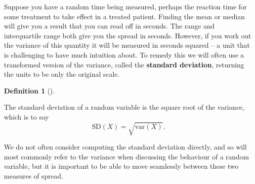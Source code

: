 \documentclass[
  letterpaper,
  DIV=11,
  numbers=noendperiod]{scrreprt}
\theoremstyle{definition}
\theoremstyle{definition}
\theoremstyle{definition}
\newtheorem{definition}{Definition}[chapter]
\theoremstyle{remark}
\begin{document}
Suppose you have a random time being measured, perhaps the reaction time
for some treatment to take effect in a treated patient. Finding the mean
or median will give you a result that you can read off in seconds. The
range and interquartile range both give you the spread in seconds.
However, if you work out the variance of this quantity it will be
measured in seconds squared -- a unit that is challenging to have much
intuition about. To remedy this we will often use a transformed version
of the variance, called the \textbf{standard deviation}, returning the
units to be only the original scale.

\begin{definition}[]\protect\hypertarget{def-sd}{}\label{def-sd}

The standard deviation of a random variable is the square root of the
variance, which is to say \[\text{SD}(X) = \sqrt{\text{var}(X)}.\]

\end{definition}

We do not often consider computing the standard deviation directly, and
so will most commonly refer to the variance when discussing the
behaviour of a random variable, but it is important to be able to move
seamlessly between these two measures of spread.
\end{document}
